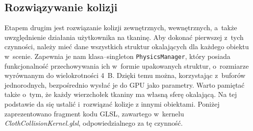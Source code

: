 		\subsection{Rozwiązywanie kolizji}
		\label{t:symulacja:dzialanie:kolizje}
			
		
		Etapem drugim jest rozwiązanie kolizji zewnętrznych, wewnętrznych, a~także uwzględnienie działania użytkownika na tkaninę. Aby dokonać pierwszej z~tych czynności, należy mieć dane wszystkich struktur okalających dla każdego obiektu w~scenie. Zapewnia je nam klasa--singleton \texttt{PhysicsManager}, który posiada funkcjonalność przechowywania ich w~formie upakowanych struktur, o~rozmiarze wyrównanym do wielokrotności 4~B. Dzięki temu można, korzystając z~buforów jednorodnych, bezpośrednio wysłać je do GPU jako parametry. Warto pamiętać także o~tym, że każdy wierzchołek tkaniny ma własną sferę okalającą. Na tej podstawie da się ustalić i~rozwiązać kolizje z innymi obiektami. Poniżej zaprezentowano fragment kodu GLSL, zawartego w~kernelu \emph{ClothCollisionKernel.glsl}, odpowiedzialnego za tę czynność.
		
